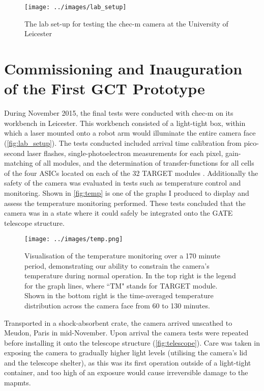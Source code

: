 \documentclass[%
amsmath,amssymb,
onecolumn,
a4paper,
10pt
]{article}%
\begin{document}
		\begin{figure}[H]
			\centering
			\texttt{[image: ../images/lab\_setup]}
			\caption{The lab set-up for testing the \gls{chec-m} camera at the University of Leicester}
			\label{fig:lab_setup}
		\end{figure}
		
	\section{Commissioning and Inauguration of the First GCT Prototype}
	
	During November 2015, the final tests were conducted with \gls{chec-m} on its workbench in Leicester. This workbench consisted of a light-tight box, within which a laser mounted onto a robot arm would illuminate the entire camera face  (\autoref{fig:lab_setup}). The tests conducted included arrival time calibration from pico-second laser flashes, single-photoelectron measurements for each pixel, gain-matching of all modules, and the determination of transfer-functions for all cells of the four ASICs located on each of the 32 TARGET modules \cite{Brown2016}. Additionally the safety of the camera was evaluated in tests such as temperature control and monitoring. Shown in \autoref{fig:temp} is one of the graphs I produced to display and assess the temperature monitoring performed. These tests concluded that the camera was in a state where it could safely be integrated onto the GATE telescope structure.
	
	\begin{figure}[h]
		\centering
		\texttt{[image: ../images/temp.png]}
		\caption{\label{fig:temp} Visualisation of the temperature monitoring over a 170 minute period, demonstrating our ability to constrain the camera's temperature during normal operation. In the top right is the legend for the graph lines, where ``TM" stands for TARGET module. Shown in the bottom right is the time-averaged temperature distribution across the camera face from 60 to 130 minutes. \cite{Brown2016}}
	\end{figure}
	
	Transported in a shock-absorbent crate, the camera arrived unscathed to Meudon, Paris in mid-November. Upon arrival the camera tests were repeated before installing it onto the telescope structure (\autoref{fig:telescope}). Care was taken in exposing the camera to gradually higher light levels (utilising the camera's lid and the telescope shelter), as this was its first operation outside of a light-tight container, and too high of an exposure would cause irreversible damage to the \glspl{mapmt}.
	
\end{document}
